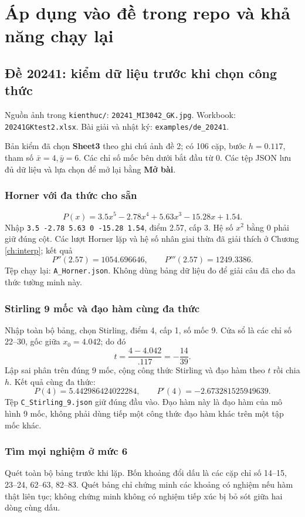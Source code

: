 \chapter{Áp dụng vào đề trong repo và khả năng chạy lại}
\label{app:exam}

\section{Đề 20241: kiểm dữ liệu trước khi chọn công thức}
Nguồn ảnh trong \texttt{kienthuc/}: \texttt{20241\_MI3042\_GK.jpg}. Workbook: \texttt{20241GKtest2.xlsx}. Bài giải và nhật ký: \texttt{examples/de\_20241}.

Bản kiểm đã chọn \textbf{Sheet3} theo ghi chú ảnh đề 2; có 106 cặp, bước $h=0.117$, tham số $\bar x=4,\bar y=6$. Các chỉ số mốc bên dưới bắt đầu từ 0. Các tệp JSON lưu đủ dữ liệu và lựa chọn để mở lại bằng \textbf{Mở bài}.

\subsection{Horner với đa thức cho sẵn}
\[
 P(x)=3.5x^5-2.78x^4+5.63x^3-15.28x+1.54.
\]
Nhập \texttt{3.5 -2.78 5.63 0 -15.28 1.54}, điểm 2.57, cấp 3. Hệ số $x^2$ bằng 0 phải giữ đúng cột. Các lượt Horner lặp và hệ số nhân giai thừa đã giải thích ở Chương \ref{ch:interp}; kết quả
\[
 P''(2.57)=1054.696646,\qquad P'''(2.57)=1249.3386.
\]
Tệp chạy lại: \texttt{A\_Horner.json}. Không dùng bảng dữ liệu đo để giải câu đã cho đa thức tường minh này.

\subsection{Stirling 9 mốc và đạo hàm cùng đa thức}
Nhập toàn bộ bảng, chọn Stirling, điểm 4, cấp 1, số mốc 9. Cửa sổ là các chỉ số 22--30, gốc giữa $x_0=4.042$; do đó
\[
 t=\frac{4-4.042}{.117}=-\frac{14}{39}.
\]
Lập sai phân trên đúng 9 mốc, cộng công thức Stirling và đạo hàm theo $t$ rồi chia $h$. Kết quả cùng đa thức:
\[
 P(4)=5.442986424022284,\qquad P'(4)=-2.673281525949639.
\]
Tệp \texttt{C\_Stirling\_9.json} giữ đúng đầu vào. Đạo hàm này là đạo hàm của mô hình 9 mốc, không phải dùng tiếp một công thức đạo hàm khác trên một tập mốc khác.

\subsection{Tìm mọi nghiệm ở mức 6}
Quét toàn bộ bảng trước khi lặp. Bốn khoảng đổi dấu là các cặp chỉ số 14--15, 23--24, 62--63, 82--83. Quét bảng chỉ chứng minh các khoảng có nghiệm nếu hàm thật liên tục; không chứng minh không có nghiệm tiếp xúc bị bỏ sót giữa hai dòng cùng dấu.

